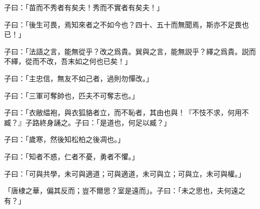 子曰：「苗而不秀者有矣夫！秀而不實者有矣夫！」

子曰：「後生可畏，焉知來者之不如今也？四十、五十而無聞焉，斯亦不足畏也已！」

子曰：「法語之言，能無從乎？改之爲貴。巽與之言，能無説乎？繹之爲貴。説而不繹，從而不改，吾末如之何也已矣！」

子曰：「主忠信，無友不如己者，過則勿憚改。」

子曰：「三軍可奪帥也，匹夫不可奪志也。」

子曰：「衣敝緼袍，與衣狐貉者立，而不恥者，其由也與！『不忮不求，何用不臧？』子路終身誦之。子曰：「是道也，何足以臧？」

子曰：「歲寒，然後知松柏之後凋也。」

子曰：「知者不惑，仁者不憂，勇者不懼。」

子曰：「可與共學，未可與適道；可與適道，未可與立；可與立，未可與權。」

「唐棣之華，偏其反而；豈不爾思？室是遠而」。子曰：「未之思也，夫何遠之有？」
